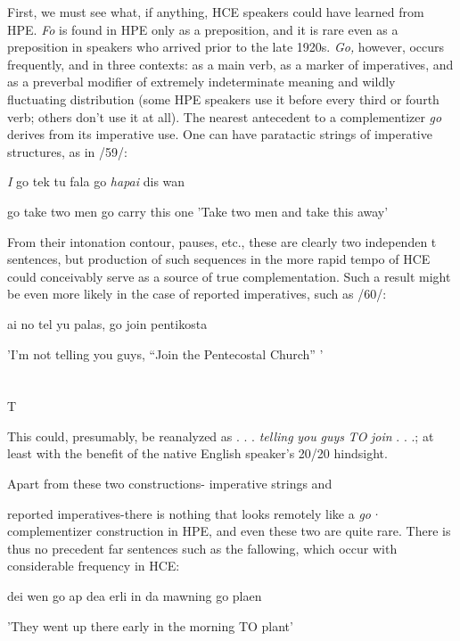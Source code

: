 First, we must see what, if anything, HCE speakers could have learned from HPE. \textit{Fo} is found in HPE only as a preposition, and it is rare even as a preposition in speakers who arrived prior to the late 1920s. \textit{Go,} however, occurs frequently, and in three contexts: as a main verb, as a marker of imperatives, and as a preverbal modifier of extremely indeterminate meaning and wildly fluctuating distribution (some HPE speakers use it before every third or fourth verb; others don't use it at all). The nearest antecedent to a complementizer \textit{go} derives from its imperative use. One can have paratactic strings of imperative structures, as in /59/:

\ea\label{ex:59}
\textit{I} go tek tu fala go \textit{hapai} dis wan

go take two men go carry this one 'Take two men and take this away'
\glt
\z

From their intonation contour, pauses, etc., these are clearly two independen t sentences, but production of such sequences in the more rapid tempo of HCE could conceivably serve as a source of true comple\-mentation. Such a result might be even more likely in the case of reported imperatives, such as /60/:

\ea\label{ex:60}
ai no tel yu palas, go join pentikosta
\glt
\z

'I'm not telling you guys, ``Join the Pentecostal Church'' '

\section{}
T


This could, presumably, be reanalyzed as . . . \textit{telling} \textit{you} \textit{guys} \textit{TO} \textit{join} . . .; at least with the benefit of the native English speaker's 20/20 hindsight.

Apart from these two constructions- imperative strings and

reported imperatives-there is nothing that looks remotely like a \textit{go·} complementizer construction in HPE, and even these two are quite rare. There is thus no precedent far sentences such as the fallowing, which occur with considerable frequency in HCE:

\ea\label{ex:61}
dei wen go ap dea erli in da mawning go plaen
\glt
\z

'They went up there early in the morning TO plant'

